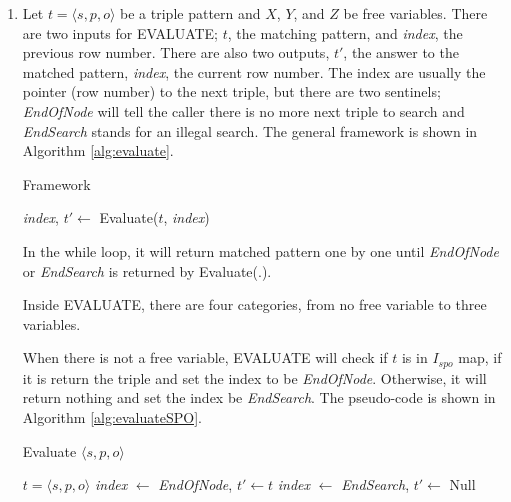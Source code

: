 \documentclass{article}
\begin{document}
\begin{enumerate}
\begin{enumerate}
\begin{algorithm}[H]
\begin{algorithmic}
\end{algorithmic}
\end{algorithm}

\item 

 
Let $t = \langle s, p, o\rangle$ be a triple pattern and $X$, $Y$, and $Z$ be free variables. There are two inputs for EVALUATE; $t$, the matching pattern, and \textit{index}, the previous row number. There are also two outputs, $t'$, the answer to the matched pattern, \textit{index}, the current row number. The index are usually the pointer (row number) to the next triple, but there are two sentinels; \textit{EndOfNode} will tell the caller there is no more next triple to search and \textit{EndSearch} stands for an illegal search. The general framework is shown in Algorithm \eqref{alg:evaluate}.

\begin{algorithm}[H]
\caption{Framework}\label{alg:evaluate}
\begin{algorithmic}

\State \textit{index}, $t' \leftarrow$ Evaluate($t$, \textit{index})
\EndWhile

\end{algorithmic}
\end{algorithm}

In the while loop, it will return matched pattern one by one until \textit{EndOfNode} or \textit{EndSearch}  is returned by Evaluate(.).

Inside EVALUATE, there are four categories, from no free variable to three variables. 

When there is not a free variable, EVALUATE will check if $t$ is in $I_{spo}$ map, if it is return the triple and set the index to be \textit{EndOfNode}. Otherwise, it will return nothing and set the index be \textit{EndSearch}. The pseudo-code is shown in Algorithm \eqref{alg:evaluateSPO}. 

\begin{algorithm}[H]
\caption{Evaluate $\langle s, p, o\rangle$}\label{alg:evaluateSPO}
\begin{algorithmic}
\Require $t = \langle s, p, o\rangle$
\State \textit{index} $\leftarrow$ \textit{EndOfNode}, $t'\leftarrow t$
\Else
\State \textit{index} $\leftarrow$ \textit{EndSearch}, $t'\leftarrow$ Null
\EndIf
\end{algorithmic}
\end{algorithm}


\end{enumerate}
\end{enumerate}
\end{document}
